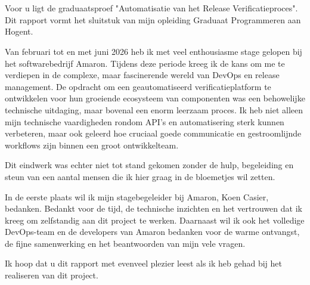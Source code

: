 
\chapter*{}%
\label{ch:voorwoord}


Voor u ligt de graduaatsproef "Automatisatie van het Release Verificatieproces". Dit rapport vormt het sluitstuk van mijn opleiding Graduaat Programmeren aan Hogent.

Van februari tot en met juni 2026 heb ik met veel enthousiasme stage gelopen bij het softwarebedrijf Amaron. Tijdens deze periode kreeg ik de kans om me te verdiepen in de complexe, maar fascinerende wereld van DevOps en release management. De opdracht om een geautomatiseerd verificatieplatform te ontwikkelen voor hun groeiende ecosysteem van componenten was een behowelijke technische uitdaging, maar bovenal een enorm leerzaam proces. Ik heb niet alleen mijn technische vaardigheden rondom API's en automatisering sterk kunnen verbeteren, maar ook geleerd hoe cruciaal goede communicatie en gestroomlijnde workflows zijn binnen een groot ontwikkelteam.

Dit eindwerk was echter niet tot stand gekomen zonder de hulp, begeleiding en steun van een aantal mensen die ik hier graag in de bloemetjes wil zetten.

In de eerste plaats wil ik mijn stagebegeleider bij Amaron, Koen Casier, bedanken. Bedankt voor de tijd, de technische inzichten en het vertrouwen dat ik kreeg om zelfstandig aan dit project te werken. Daarnaast wil ik ook het volledige DevOps-team en de developers van Amaron bedanken voor de warme ontvangst, de fijne samenwerking en het beantwoorden van mijn vele vragen.

Ik hoop dat u dit rapport met evenveel plezier leest als ik heb gehad bij het realiseren van dit project.